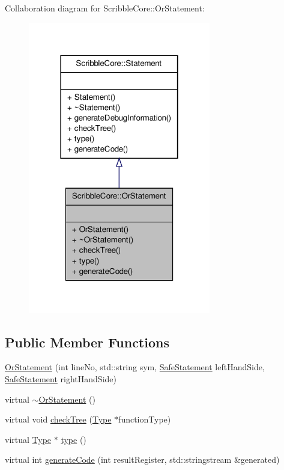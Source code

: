 Collaboration diagram for Scribble\-Core\-:\-:Or\-Statement\-:
\nopagebreak
\begin{figure}[H]
\begin{center}
\leavevmode
\includegraphics[width=226pt]{class_scribble_core_1_1_or_statement__coll__graph}
\end{center}
\end{figure}
\subsection*{Public Member Functions}
\begin{DoxyCompactItemize}
\item 
\hyperlink{class_scribble_core_1_1_or_statement_a4703fe908d4aa5df3a96854d40cd5179}{Or\-Statement} (int line\-No, std\-::string sym, \hyperlink{namespace_scribble_core_a2ad5bf236bc9164cb56f564685f15a11}{Safe\-Statement} left\-Hand\-Side, \hyperlink{namespace_scribble_core_a2ad5bf236bc9164cb56f564685f15a11}{Safe\-Statement} right\-Hand\-Side)
\item 
virtual \hyperlink{class_scribble_core_1_1_or_statement_a53d56ccda4f83efffc7ac15857bcebdc}{$\sim$\-Or\-Statement} ()
\item 
virtual void \hyperlink{class_scribble_core_1_1_or_statement_a8c61e63a836a6f6f3189e7fb19370c7a}{check\-Tree} (\hyperlink{class_scribble_core_1_1_type}{Type} $\ast$function\-Type)
\item 
virtual \hyperlink{class_scribble_core_1_1_type}{Type} $\ast$ \hyperlink{class_scribble_core_1_1_or_statement_a1b5189b085d975ed9f904a7307b912d1}{type} ()
\item 
virtual int \hyperlink{class_scribble_core_1_1_or_statement_afabb7207c4594a8840403397de51e0c6}{generate\-Code} (int result\-Register, std\-::stringstream \&generated)
\end{DoxyCompactItemize}



